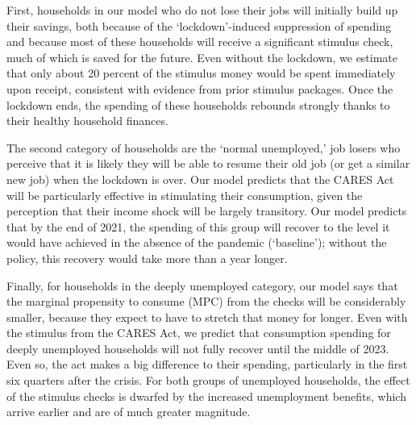 First, households in our model who do not lose their jobs will initially build up their savings, both because of the `lockdown'-induced suppression of spending and because %
most of these households will receive a significant stimulus check, much of which is saved for the future.
Even without the lockdown, we estimate that only about 20 percent of the stimulus money would be spent immediately upon receipt, consistent with evidence from prior stimulus packages.
Once the lockdown ends, the spending of these households rebounds strongly thanks to their healthy household finances.

The second category of households are the `normal unemployed,' job losers who perceive that it is likely they will be able to resume their old job (or get a similar new job) when the lockdown is over.
Our model predicts that the CARES Act will be particularly effective in stimulating their consumption, given the perception that their income shock will be largely transitory.  Our model predicts that by the end of 2021, the spending of this group will recover to the level it would have achieved in the absence of the pandemic (`baseline'); without the policy, this recovery would take more than a year longer.

Finally, for households in the deeply unemployed category, our model says that the marginal propensity to consume (MPC) from the checks will be considerably smaller, because they expect to have to stretch that money for longer.
Even with the stimulus from the CARES Act, we predict that consumption spending for deeply unemployed households will not fully recover until the middle of 2023.
Even so, the act makes a big difference to their spending, particularly in the first six quarters after the crisis.
For both groups of unemployed households, the effect of the stimulus checks is dwarfed by the increased unemployment benefits, which arrive earlier and are of much greater magnitude.

